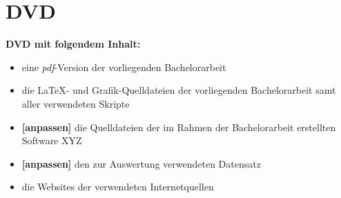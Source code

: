 %
\setcounter{figure}{0}
\renewcommand{\thesection}{\Alph{section}}
\renewcommand{\thefigure}{{\Alph{section}\arabic{figure}}}
\appendix
{}
\newpage
\section{DVD}\label{dvd}
\textbf{DVD mit folgendem Inhalt:}
\begin{itemize}\setlength\itemsep{0em}\setlength\parskip{0em}
%
 \item eine \emph{pdf}-Version der vorliegenden Bachelorarbeit
 \item die \LaTeX- und Grafik-Quelldateien der vorliegenden Bachelorarbeit samt aller verwendeten Skripte
 \item \textbf{[anpassen]} die Quelldateien der im Rahmen der Bachelorarbeit erstellten Software XYZ
 \item \textbf{[anpassen]} den zur Auswertung verwendeten Datensatz
 \item die Websites der verwendeten Internetquellen
\end{itemize}


\vfill

\begin{center}
  \vspace{-3cm}
\end{center}

% 

